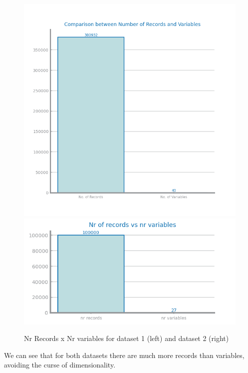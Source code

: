 \documentclass[10pt]{extarticle}
\begin{document}
\begin{figure}[H]
\centering
\includegraphics[scale=0.70]{images/dataset1/data_profiling/CovidPos_records_variables.png}
\includegraphics[scale=0.7]{images/dataset2/data_profiling/Credit_Score_records_variables.png}
\caption{Nr Records x Nr variables for dataset 1 (left) and dataset 2 (right)} 
\end{figure}
We can see that for both datasets there are much more records than variables, avoiding the curse of dimensionality.
\end{document}
